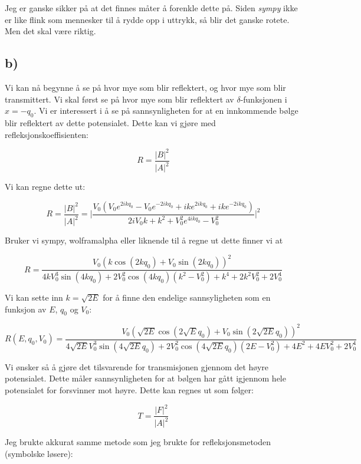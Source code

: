 \documentclass[a4paper,norsk, 10pt]{article}
\numberwithin{equation}{section}
\begin{document}
Jeg er ganske sikker på at det finnes måter å forenkle dette på. Siden \textit{sympy} ikke er like flink som mennesker til å rydde opp i uttrykk, så blir det ganske rotete. Men det skal være riktig.


\subsection*{b)}

Vi kan nå begynne å se på hvor mye som blir reflektert, og hvor mye som blir transmittert. Vi skal først se på hvor mye som blir reflektert av $\delta$-funksjonen i $x = -q_0$. Vi er interessert i å se på sannsynligheten for at en innkommende bølge blir reflektert av dette potensialet. Dette kan vi gjøre med refleksjonskoeffisienten:

\begin{equation}
R = \frac{|B|^2}{|A|^2}
\label{eq:refleks}
\end{equation}

Vi kan regne dette ut:

$$
R = \frac{|B|^2}{|A|^2} = \bigg|\frac{V_0\left(V_0e^{2ikq_0} - V_0e^{-2ikq_0} + ike^{2ikq_0} + ike^{-2ikq_0}\right)}{2iV_0k + k^2 +V_0^2e^{4ikq_0} - V_0^2}\bigg|^2
$$

Bruker vi sympy, wolframalpha eller liknende til å regne ut dette finner vi at 

$$
R = \frac{V_0\left(k\cos(2kq_0) + V_0\sin(2kq_0)\right)^2}{4kV_0^3\sin(4kq_0) + 2V_0^2\cos(4kq_0)(k^2 - V_0^2)+k^4 +2k^2V_0^2 + 2V_0^4}
$$

Vi kan sette inn $k = \sqrt{2E}$ for å finne den endelige sannsyligheten som en funksjon av $E$, $q_0$ og $V_0$:

\begin{equation}
R(E,q_0,V_0) = \frac{V_0\left(\sqrt{2E}\cos(2\sqrt{E}q_0) + V_0\sin(2\sqrt{2E} q_0)\right)^2}{4\sqrt{2E}V_0^3\sin(4\sqrt{2E} q_0) + 2V_0^2\cos(4\sqrt{2E} q_0)(2E - V_0^2)+4E^2 +4EV_0^2 + 2V_0^4}
\label{eq:R}
\end{equation}


Vi ønsker så å gjøre det tilsvarende for transmisjonen gjennom det høyre potensialet. Dette måler sannsynligheten for at bølgen har gått igjennom hele potensialet for forsvinner mot høyre. Dette kan regnes ut som følger:

\begin{equation}
T = \frac{|F|^2}{|A|^2}
\label{eq:transmit}
\end{equation}

Jeg brukte akkurat samme metode som jeg brukte for refleksjonsmetoden (symbolske løsere):
\end{document}
